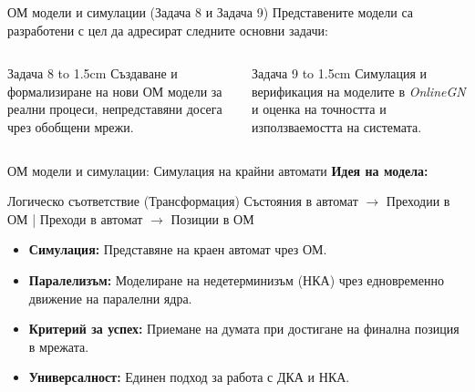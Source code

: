 \documentclass[aspectratio=169]{beamer}
\begin{document}
\begin{frame}{ОМ модели и симулации (Задача 8 и Задача 9)}
Представените модели са разработени с цел да адресират следните основни задачи:

    \begin{columns}[T]
            \begin{block}{Задача 8}
                \vbox to 1.5cm{
                    \vspace{0.1cm}
                    \small Създаване и формализиране на нови ОМ модели за реални процеси, непредставяни досега чрез обобщени мрежи.
                    \vfil
                }
            \end{block}

            \begin{block}{Задача 9}
                \vbox to 1.5cm{
                    \vspace{0.1cm}
                    \small Симулация и верификация на моделите в \textit{OnlineGN} и оценка на точността и използваемостта на системата.
                    \vfil
                }
            \end{block}
    \end{columns}
\end{frame}

\begin{frame}{ОМ модели и симулации: Симулация на крайни автомати}
    \vspace{-0.2cm}
    \textbf{Идея на модела:}
    \vspace{0.2cm}

    \begin{block}{Логическо съответствие (Трансформация)}
        \centering
        \vspace{0.1cm}
        \large
        Състояния в автомат $\boldsymbol{\rightarrow}$ Преходии в ОМ \quad | \quad Преходи в автомат $\boldsymbol{\rightarrow}$ Позиции в ОМ
        \vspace{0.1cm}
    \end{block}

    \vspace{0.3cm}

    \begin{itemize}
        \setlength\itemsep{0.7em} 
        \item \textbf{Симулация:} Представяне на краен автомат чрез ОМ.
        \item \textbf{Паралелизъм:} Моделиране на недетерминизъм (НКА) чрез едновременно движение на паралелни ядра.
        \item \textbf{Критерий за успех:} Приемане на думата при достигане на финална позиция в мрежата.
        \item \textbf{Универсалност:} Единен подход за работа с ДКА и НКА.
    \end{itemize}
\end{frame}
\end{document}
